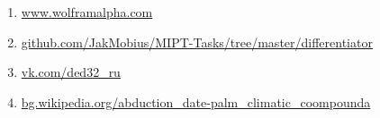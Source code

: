 \documentclass{article}
\begin{document}
\begin{enumerate}\item\href{https://www.wolframalpha.com}{www.wolframalpha.com}\\
\item\href{https://github.com/JakMobius/MIPT-Tasks/tree/master/differentiator}{github.com/JakMobius/MIPT-Tasks/tree/master/differentiator}\\
\item\href{https://vk.com/ded32_ru}{vk.com/ded32\_ru}\\
\item\href{https://en.wikipedia.org/wiki/Special:Random}{bg.wikipedia.org/abduction\_date-palm\_climatic\_coompounda}\end{enumerate}
\end{document}

